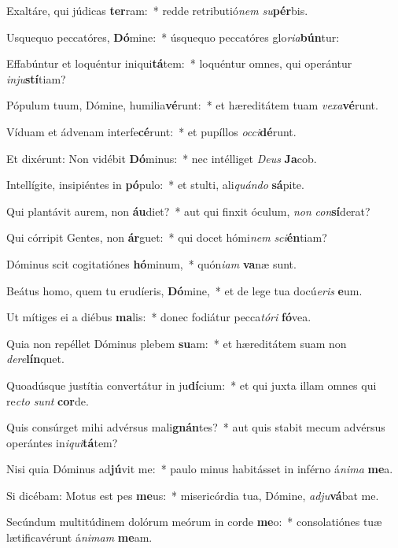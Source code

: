  \item Exaltáre, qui júdicas \textbf{ter}ram:~* redde retributió\textit{nem} \textit{su}\textbf{pér}bis.
\item Usquequo peccatóres, \textbf{Dó}mine:~* úsquequo peccatóres glo\textit{ria}\textbf{bún}tur:
\item Effabúntur et loquéntur iniqui\textbf{tá}tem:~* loquéntur omnes, qui operántur \textit{inju}\textbf{stí}tiam?
\item Pópulum tuum, Dómine, humilia\textbf{vé}runt:~* et hæreditátem tuam \textit{vexa}\textbf{vé}runt.
\item Víduam et ádvenam interfe\textbf{cé}runt:~* et pupíllos \textit{occi}\textbf{dé}runt.
\item Et dixérunt: Non vidébit \textbf{Dó}minus:~* nec intélliget \textit{Deus} \textbf{Ja}cob.
\item Intellígite, insipiéntes in \textbf{pó}pulo:~* et stulti, ali\tinyhspace\textit{quándo} \textbf{sá}pite.
\item Qui plantávit aurem, non \textbf{áu}diet?~* aut qui finxit óculum, \textit{non} \textit{con}\textbf{sí}derat?
\item Qui córripit Gentes, non \textbf{ár}guet:~* qui docet hómi\textit{nem} \textit{sci}\textbf{én}tiam?
\item Dóminus scit cogitatiónes \textbf{hó}minum,~* quón\textit{iam} \textbf{va}næ sunt.
\item Beátus homo, quem tu erudíeris, \textbf{Dó}mine,~* et de lege tua docú\hspace*{0.01em}\textit{eris} \textbf{e}um.
\item Ut mítiges ei a diébus \textbf{ma}lis:~* donec fodiátur pecca\tinyhspace\textit{tóri} \textbf{fó}vea.
\item Quia non repéllet Dóminus plebem \textbf{su}am:~* et hæreditátem suam non \textit{dere}\textbf{lín}quet.
\item Quoadúsque justítia convertátur in ju\textbf{dí}cium:~* et qui juxta illam omnes qui re\tinyhspace\textit{cto} \textit{sunt} \textbf{cor}de.
\item Quis consúrget mihi advérsus mali\textbf{gnán}tes?~* aut quis stabit mecum advérsus operántes in\textit{iqui}\textbf{tá}tem?
\item Nisi quia Dóminus ad\textbf{jú}vit me:~* paulo minus habitásset in inférno á\tinyhspace\textit{nima} \textbf{me}a.
\item Si dicébam: Motus est pes \textbf{me}us:~* misericórdia tua, Dómine, \textit{adju}\textbf{vá}bat me.
\item Secúndum multitúdinem dolórum meórum in corde \textbf{me}o:~* consolatiónes tuæ lætificavérunt á\tinyhspace\textit{nimam} \textbf{me}am.
